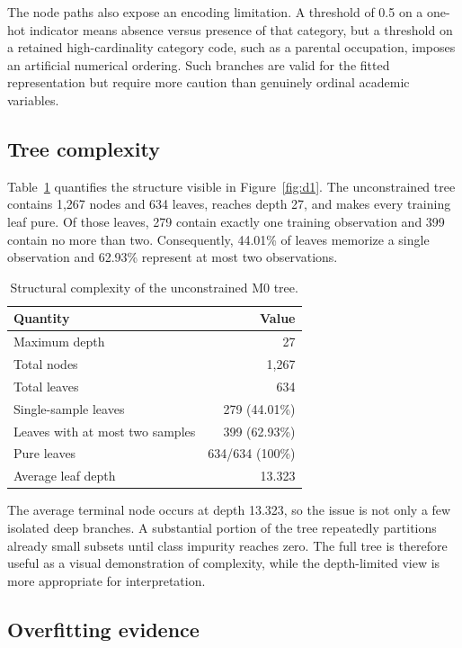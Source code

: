 The node paths also expose an encoding limitation. A threshold of 0.5 on a
one-hot indicator means absence versus presence of that category, but a
threshold on a retained high-cardinality category code, such as a parental
occupation, imposes an artificial numerical ordering. Such branches are valid
for the fitted representation but require more caution than genuinely ordinal
academic variables.

\subsection{Tree complexity}

Table~\ref{tab:e-complexity} quantifies the structure visible in
Figure~\ref{fig:d1}. The unconstrained tree contains 1{,}267 nodes and 634
leaves, reaches depth 27, and makes every training leaf pure. Of those leaves,
279 contain exactly one training observation and 399 contain no more than two.
Consequently, 44.01\% of leaves memorize a single observation and 62.93\%
represent at most two observations.

\begin{table}[H]
  \centering
  \caption{Structural complexity of the unconstrained M0 tree.}
  \label{tab:e-complexity}
  \begin{tabular}{@{}lr@{}}
    \toprule
    Quantity & Value \\
    \midrule
    Maximum depth & 27 \\
    Total nodes & 1{,}267 \\
    Total leaves & 634 \\
    Single-sample leaves & 279 (44.01\%) \\
    Leaves with at most two samples & 399 (62.93\%) \\
    Pure leaves & 634/634 (100\%) \\
    Average leaf depth & 13.323 \\
    \bottomrule
  \end{tabular}
\end{table}

The average terminal node occurs at depth 13.323, so the issue is not only a
few isolated deep branches. A substantial portion of the tree repeatedly
partitions already small subsets until class impurity reaches zero. The full
tree is therefore useful as a visual demonstration of complexity, while the
depth-limited view is more appropriate for interpretation.

\subsection{Overfitting evidence}

